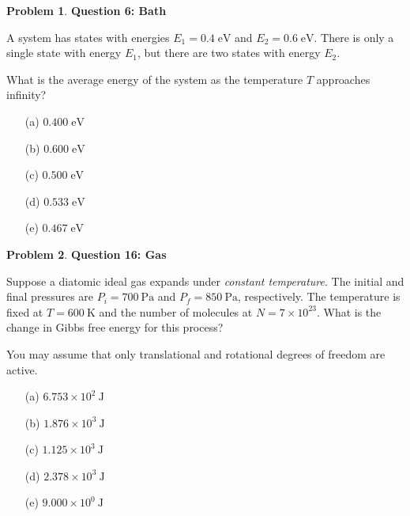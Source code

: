 \documentclass[10pt]{article}
\theoremstyle{definition} %
\newtheorem{problem}{Problem}
\theoremstyle{plain} %
\begin{document}
              \begin{problem}
                \textbf{Question 6: Bath}
                
                A system has states with energies \(E_{1} = 0.4\;\text{eV}\) and \(E_{2} = 0.6\;\text{eV}\).
                There is only a single state with energy \(E_{1}\), but there are two states with energy \(E_{2}\).
                
                \medskip
                What is the average energy of the system as the temperature \(T\) approaches infinity?
                
                \begin{enumerate}
                  \item[(a)] \(0.400\;\text{eV}\)
                  \item[(b)] \(0.600\;\text{eV}\)
                  \item[(c)] \(0.500\;\text{eV}\)
                  \item[(d)] \(0.533\;\text{eV}\)
                  \item[(e)] \(0.467\;\text{eV}\)
                \end{enumerate}
                \end{problem}
                \begin{problem}
                  \textbf{Question 16: Gas}
                  
                  Suppose a diatomic ideal gas expands under \emph{constant temperature}.
                  The initial and final pressures are
                  \(P_i = 700\ \text{Pa}\) and \(P_f = 850\ \text{Pa}\), respectively.
                  The temperature is fixed at \(T = 600\ \text{K}\) and the number of
                  molecules at \(N = 7\times10^{23}\).
                  What is the change in Gibbs free energy for this process?
                  
                  You may assume that only translational and rotational degrees of
                  freedom are active.
                  
                  \begin{enumerate}
                    \item[(a)] \(6.753\times10^{2}\ \text{J}\)
                    \item[(b)] \(1.876\times10^{3}\ \text{J}\)
                    \item[(c)] \(1.125\times10^{3}\ \text{J}\)
                    \item[(d)] \(2.378\times10^{3}\ \text{J}\)
                    \item[(e)] \(9.000\times10^{0}\ \text{J}\)
                  \end{enumerate}
                  \end{problem}
\end{document}

